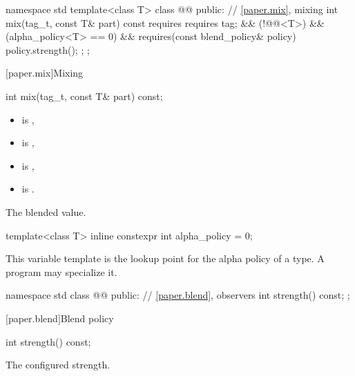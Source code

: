 \begin{codeblock}
namespace std {
  template<class T>
  class @@ {
  public:
    // \ref{paper.mix}, mixing
    int mix(tag_t, const T& part) const
      requires requires { tag; } && (!@@<T>) && (alpha_policy<T> == 0) &&
               requires(const blend_policy& policy) { policy.strength(); };
  };
}
\end{codeblock}

[paper.mix]{Mixing}

%
\begin{itemdecl}
int mix(tag_t, const T& part) const;
\end{itemdecl}

\begin{itemdescr}
\pnum
\constraints
\begin{itemize}
\item {} is ,
\item {} is ,
\item {} is ,
\item {} is .
\end{itemize}

\pnum
\returns
The blended value.
\end{itemdescr}

%
\begin{itemdecl}
template<class T>
  inline constexpr int alpha_policy = 0;
\end{itemdecl}

\begin{itemdescr}
\pnum
\remarks
This variable template is the lookup point for the alpha policy of a type. A program may specialize it.
\end{itemdescr}

\begin{codeblock}
namespace std {
  class @@ {
  public:
    // \ref{paper.blend}, observers
    int strength() const;
  };
}
\end{codeblock}

[paper.blend]{Blend policy}

%
\begin{itemdecl}
int strength() const;
\end{itemdecl}

\begin{itemdescr}
\pnum
\returns
The configured strength.
\end{itemdescr}
